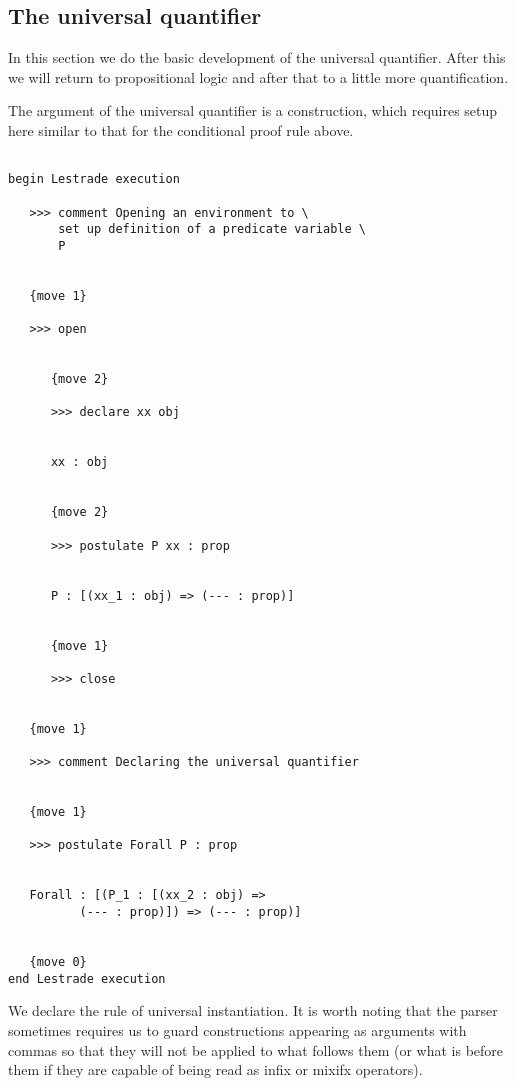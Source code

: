 \documentclass[12pt]{article}
\begin{document}
\subsection{The universal quantifier}

In this section we do the basic development of the universal quantifier.   After this we will return to propositional logic and after that to a little more quantification.

The argument of the universal quantifier is a construction, which requires setup here similar to that for the conditional proof rule above.

\begin{verbatim}

begin Lestrade execution

   >>> comment Opening an environment to \
       set up definition of a predicate variable \
       P


   {move 1}

   >>> open


      {move 2}

      >>> declare xx obj


      xx : obj


      {move 2}

      >>> postulate P xx : prop


      P : [(xx_1 : obj) => (--- : prop)]


      {move 1}

      >>> close


   {move 1}

   >>> comment Declaring the universal quantifier


   {move 1}

   >>> postulate Forall P : prop


   Forall : [(P_1 : [(xx_2 : obj) => 
          (--- : prop)]) => (--- : prop)]


   {move 0}
end Lestrade execution
\end{verbatim}

We declare the rule of universal instantiation.  It is worth noting that the parser sometimes requires us to guard constructions appearing as arguments with commas
so that they will not be applied to what follows them (or what is before them if they are capable of being read as infix or mixifx operators).
\end{document}
